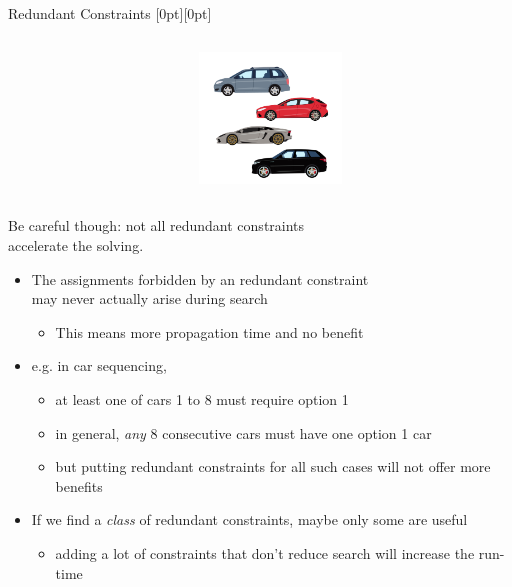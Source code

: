 \documentclass{cons-beamer}
\begin{document}
\begin{frame}{Redundant Constraints}
  \raisebox{-\height}[0pt][0pt]{%
    \begin{columns}
      \begin{column}{0.7\textwidth}
          
      \end{column}
      \begin{column}{0.3\textwidth}
        \includegraphics[height=35mm]{images/car_seq.png}%
      \end{column}
    \end{columns}
  }

  \alert{Be careful though: not all redundant constraints \\accelerate the solving.}
  \vfill

  \begin{itemize}
    \item The assignments forbidden by an redundant constraint \\ may never actually arise during search
      \begin{itemize}
        \item This means more propagation time and no benefit
      \end{itemize}
      \vfill

    \item e.g. in car sequencing,
      \begin{itemize}
        \item at least one of cars 1 to 8 must require option 1
        \item in general, \emph{any} 8 consecutive cars must have one option 1 car
        \item but putting redundant constraints for all such cases will not offer more benefits
      \end{itemize}
      \vfill

    \item If we find a \emph{class} of redundant constraints, maybe only some are useful
      \begin{itemize}
        \item adding a lot of constraints that don’t reduce search will increase the run-time
      \end{itemize}
  \end{itemize}
\end{frame}
\end{document}
